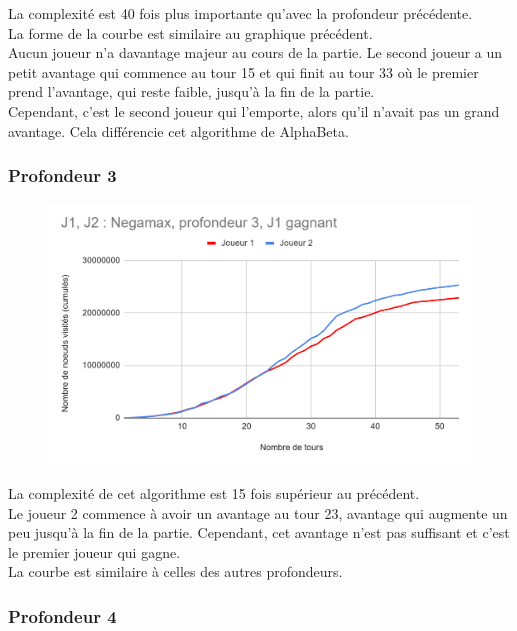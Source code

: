 \documentclass[12pt]{article}
\begin{document}
La complexité est 40 fois plus importante qu’avec la profondeur précédente.\\
La forme de la courbe est similaire au graphique précédent.\\
Aucun joueur n’a davantage majeur au cours de la partie. Le second joueur a un petit avantage qui commence au tour 15 et qui finit au tour 33 où le premier prend l’avantage, qui reste faible, jusqu’à la fin de la partie. \\
Cependant, c’est le second joueur qui l’emporte, alors qu’il n’avait pas un grand avantage. Cela différencie cet algorithme de AlphaBeta.

\newpage
\subsubsection{Profondeur 3}

\begin{figure}[!h]
   \includegraphics[width=\textwidth]{prof3negamax.png}
\end{figure}

La complexité de cet algorithme est 15 fois supérieur au précédent.\\
Le joueur 2 commence à avoir un avantage au tour 23, avantage qui augmente un peu jusqu’à la fin de la partie. Cependant, cet avantage n’est pas suffisant et c’est le premier joueur qui gagne.\\
La courbe est similaire à celles des autres profondeurs.

\newpage
\subsubsection{Profondeur 4}
\end{document}
